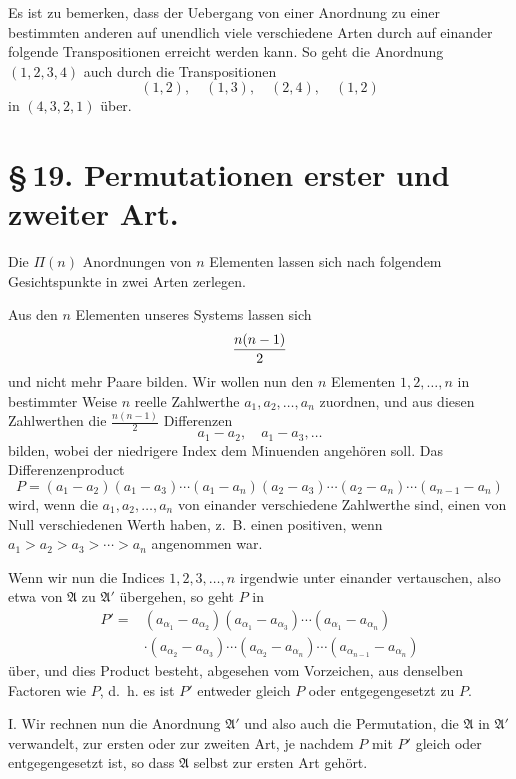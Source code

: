 \documentclass[11pt]{article}
\begin{document}
Es ist zu bemerken, dass der Uebergang von einer Anordnung zu einer bestimmten anderen auf unendlich viele verschiedene Arten durch auf einander folgende Transpositionen erreicht werden kann. So geht die Anordnung \((1,2,3,4)\) auch durch die Transpositionen
\[
(1,2),\quad (1,3),\quad (2,4),\quad (1,2)
\]
in \((4,3,2,1)\) über.

\section*{\S\,19. Permutationen erster und zweiter Art.}

Die \(\Pi(n)\) Anordnungen von \(n\) Elementen lassen sich nach folgendem Gesichtspunkte in zwei Arten zerlegen.

Aus den \(n\) Elementen unseres Systems lassen sich
\[
{n(n-1)\over2}
\]
und nicht mehr Paare bilden. Wir wollen nun den \(n\) Elementen \(1,2,\ldots,n\) in bestimmter Weise \(n\) reelle Zahlwerthe \(a_1,a_2,\ldots,a_n\) zuordnen, und aus diesen Zahlwerthen die \(\frac{n(n-1)}2\) Differenzen
\[
a_1-a_2,\quad a_1-a_3,\ldots
\]
bilden, wobei der niedrigere Index dem Minuenden angehören soll. Das Differenzenproduct
\begin{equation}
P=(a_1-a_2)(a_1-a_3)\cdots(a_1-a_n)
(a_2-a_3)\cdots(a_2-a_n)\cdots(a_{n-1}-a_n)
\tag{1}
\end{equation}
wird, wenn die \(a_1,a_2,\ldots,a_n\) von einander verschiedene Zahlwerthe sind, einen von Null verschiedenen Werth haben, z.~B. einen positiven, wenn \(a_1>a_2>a_3>\cdots>a_n\) angenommen war.

Wenn wir nun die Indices \(1,2,3,\ldots,n\) irgendwie unter einander vertauschen, also etwa von \(\mathfrak A\) zu \(\mathfrak A'\) übergehen, so geht \(P\) in
\begin{equation}
\begin{aligned}
P'={}&(a_{\alpha_1}-a_{\alpha_2})(a_{\alpha_1}-a_{\alpha_3})\cdots
(a_{\alpha_1}-a_{\alpha_n})\\
&\cdot(a_{\alpha_2}-a_{\alpha_3})\cdots(a_{\alpha_2}-a_{\alpha_n})
\cdots(a_{\alpha_{n-1}}-a_{\alpha_n})
\end{aligned}
\tag{2}
\end{equation}
über, und dies Product besteht, abgesehen vom Vorzeichen, aus denselben Factoren wie \(P\), d.~h. es ist \(P'\) entweder gleich \(P\) oder entgegengesetzt zu \(P\).

I. Wir rechnen nun die Anordnung \(\mathfrak A'\) und also auch die Permutation, die \(\mathfrak A\) in \(\mathfrak A'\) verwandelt, zur ersten oder zur zweiten Art, je nachdem \(P\) mit \(P'\) gleich oder entgegengesetzt ist, so dass \(\mathfrak A\) selbst zur ersten Art gehört.
\end{document}
